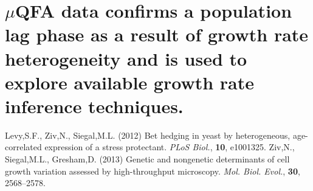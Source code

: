 \documentclass[a4paper]{article}
\begin{document}
\section{$\mu$QFA data confirms a population lag phase as a result of growth rate heterogeneity and is used to explore available growth rate inference techniques.}

\begin{thebibliography}{}
 Levy,S.F., Ziv,N., Siegal,M.L. (2012) Bet hedging in yeast by heterogeneous, age-correlated expression of a stress protectant. {\it PLoS Biol.}, {\bf 10}, e1001325.
Ziv,N., Siegal,M.L., Gresham,D. (2013) Genetic and nongenetic determinants of cell growth variation assessed by high-throughput microscopy. {\it Mol. Biol. Evol.}, {\bf 30}, 2568–2578. 

\end{thebibliography}{}
\end{document}
